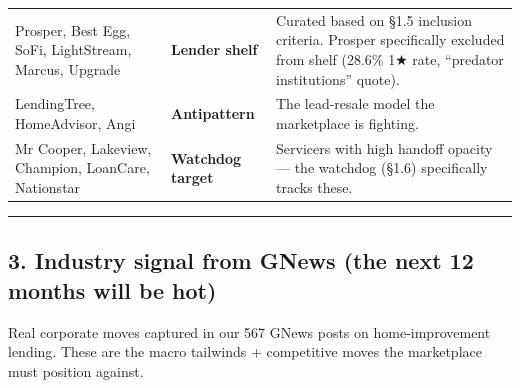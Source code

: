 \documentclass[
  10pt,
]{article}
\begin{document}
\begin{longtable}[]{@{}lll@{}}
\begin{minipage}[t]{0.30\columnwidth}\raggedright
Prosper, Best Egg, SoFi, LightStream, Marcus, Upgrade\strut
\end{minipage} & \begin{minipage}[t]{0.30\columnwidth}\raggedright
\textbf{Lender shelf}\strut
\end{minipage} & \begin{minipage}[t]{0.30\columnwidth}\raggedright
Curated based on §1.5 inclusion criteria. Prosper specifically excluded from shelf (28.6\% 1★ rate,
``predator institutions'' quote).\strut
\end{minipage}\tabularnewline
\begin{minipage}[t]{0.30\columnwidth}\raggedright
LendingTree, HomeAdvisor, Angi\strut
\end{minipage} & \begin{minipage}[t]{0.30\columnwidth}\raggedright
\textbf{Antipattern}\strut
\end{minipage} & \begin{minipage}[t]{0.30\columnwidth}\raggedright
The lead-resale model the marketplace is fighting.\strut
\end{minipage}\tabularnewline
\begin{minipage}[t]{0.30\columnwidth}\raggedright
Mr Cooper, Lakeview, Champion, LoanCare, Nationstar\strut
\end{minipage} & \begin{minipage}[t]{0.30\columnwidth}\raggedright
\textbf{Watchdog target}\strut
\end{minipage} & \begin{minipage}[t]{0.30\columnwidth}\raggedright
Servicers with high handoff opacity --- the watchdog (§1.6) specifically tracks these.\strut
\end{minipage}\tabularnewline
\bottomrule
\end{longtable}

\begin{center}\rule{0.5\linewidth}{0.5pt}\end{center}

\hypertarget{industry-signal-from-gnews-the-next-12-months-will-be-hot}{%
\subsection{3. Industry signal from GNews (the next 12 months will be
hot)}\label{industry-signal-from-gnews-the-next-12-months-will-be-hot}}

Real corporate moves captured in our 567 GNews posts on home-improvement lending. These are the
macro tailwinds + competitive moves the marketplace must position against.
\end{document}
